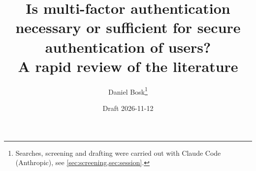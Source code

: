 \documentclass[a4paper,10pt,article,oneside]{memoir}
\title{%
  Is multi-factor authentication necessary or sufficient for secure
  authentication of users?\\
  \large A rapid review of the literature%
}
\author{Daniel Bosk\thanks{%
  Searches, screening and drafting were carried out with Claude Code
  (Anthropic), see \cref{sec:screening,sec:session}.%
}}
\date{Draft 2026-11-12}
\begin{document}
\maketitle
\begin{abstract}
  
\end{abstract}

\tableofcontents*


\end{document}
